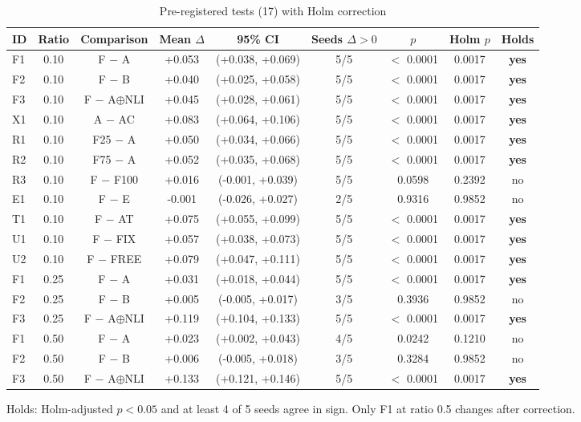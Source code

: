 \begin{table}[t]
\centering
\small
\caption{Pre-registered tests (17) with Holm correction}
\begin{tabular}{lcccccccc}
\toprule
ID & Ratio & Comparison & Mean $\Delta$ & 95\% CI & Seeds $\Delta>0$ & $p$ & Holm $p$ & Holds \\
\midrule
F1 & 0.10 & F $-$ A & +0.053 & (+0.038, +0.069) & 5/5 & $<$ 0.0001 & 0.0017 & \textbf{yes} \\
F2 & 0.10 & F $-$ B & +0.040 & (+0.025, +0.058) & 5/5 & $<$ 0.0001 & 0.0017 & \textbf{yes} \\
F3 & 0.10 & F $-$ A$\oplus$NLI & +0.045 & (+0.028, +0.061) & 5/5 & $<$ 0.0001 & 0.0017 & \textbf{yes} \\
X1 & 0.10 & A $-$ AC & +0.083 & (+0.064, +0.106) & 5/5 & $<$ 0.0001 & 0.0017 & \textbf{yes} \\
R1 & 0.10 & F25 $-$ A & +0.050 & (+0.034, +0.066) & 5/5 & $<$ 0.0001 & 0.0017 & \textbf{yes} \\
R2 & 0.10 & F75 $-$ A & +0.052 & (+0.035, +0.068) & 5/5 & $<$ 0.0001 & 0.0017 & \textbf{yes} \\
R3 & 0.10 & F $-$ F100 & +0.016 & (-0.001, +0.039) & 5/5 & 0.0598 & 0.2392 & no \\
E1 & 0.10 & F $-$ E & -0.001 & (-0.026, +0.027) & 2/5 & 0.9316 & 0.9852 & no \\
T1 & 0.10 & F $-$ AT & +0.075 & (+0.055, +0.099) & 5/5 & $<$ 0.0001 & 0.0017 & \textbf{yes} \\
U1 & 0.10 & F $-$ FIX & +0.057 & (+0.038, +0.073) & 5/5 & $<$ 0.0001 & 0.0017 & \textbf{yes} \\
U2 & 0.10 & F $-$ FREE & +0.079 & (+0.047, +0.111) & 5/5 & $<$ 0.0001 & 0.0017 & \textbf{yes} \\
F1 & 0.25 & F $-$ A & +0.031 & (+0.018, +0.044) & 5/5 & $<$ 0.0001 & 0.0017 & \textbf{yes} \\
F2 & 0.25 & F $-$ B & +0.005 & (-0.005, +0.017) & 3/5 & 0.3936 & 0.9852 & no \\
F3 & 0.25 & F $-$ A$\oplus$NLI & +0.119 & (+0.104, +0.133) & 5/5 & $<$ 0.0001 & 0.0017 & \textbf{yes} \\
F1 & 0.50 & F $-$ A & +0.023 & (+0.002, +0.043) & 4/5 & 0.0242 & 0.1210 & no \\
F2 & 0.50 & F $-$ B & +0.006 & (-0.005, +0.018) & 3/5 & 0.3284 & 0.9852 & no \\
F3 & 0.50 & F $-$ A$\oplus$NLI & +0.133 & (+0.121, +0.146) & 5/5 & $<$ 0.0001 & 0.0017 & \textbf{yes} \\
\bottomrule
\end{tabular}
\par\smallskip\footnotesize Holds: Holm-adjusted $p < 0.05$ and at least 4 of 5 seeds agree in sign. Only F1 at ratio 0.5 changes after correction.
\end{table}

